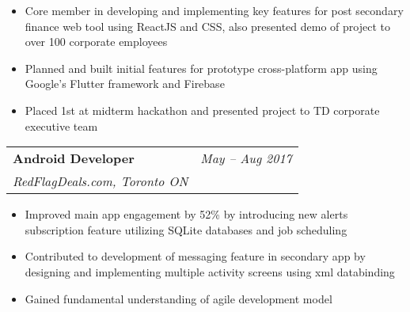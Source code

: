\documentclass[letterpaper,10pt]{article}
\makeatletter
\newcommand{\resumeItem}[2]{
  \item[]\small{
    \textbf{#1}{: #2 \vspace{-2pt}}
  }
}
\newcommand{\resumeSubheading}[4]{
  \vspace{-1pt}\item
    \begin{tabular*}{0.97\textwidth}{l@{\extracolsep{\fill}}r}
      \textbf{#1} & #2 \\
      \textit{\small#3} & \textit{\small #4} \\
    \end{tabular*}\vspace{-5pt}
}
\newcommand{\resumeItemListStart}{\begin{itemize}}
\newcommand{\resumeItemListEnd}{\end{itemize}\vspace{-5pt}}
\makeatother
\begin{document}
      \vspace{0.4em}
        \begin{minipage}{0.9\textwidth}
      \resumeItemListStart
      \item Core member in developing and implementing key features for post secondary finance web tool using {ReactJS} and {CSS}, also presented demo of project to over {100} corporate employees
      \vspace{-0.25em}
       \item Planned and built initial features for prototype cross-platform app using {Google's Flutter} framework and {Firebase}
      \vspace{-0.25em}
      \item {Placed 1st} at midterm hackathon and presented project to TD corporate executive team
      \resumeItemListEnd
      \end{minipage}%
      
    \resumeSubheading
      {Android Developer}{\textit{May -- Aug 2017}}
      {RedFlagDeals.com, Toronto ON}{}
        
        \vspace{0.40em}
        \begin{minipage}{0.9\textwidth}
      \resumeItemListStart
      \item Improved main app engagement by {52\%} by introducing new alerts subscription feature utilizing {SQLite databases} and {job scheduling}
      \vspace{-0.25em}
      \item Contributed to development of messaging feature in secondary app by designing and implementing multiple activity screens using {xml databinding}
      \vspace{-0.25em}
      \item Gained fundamental understanding of {agile} development model
      \resumeItemListEnd
      \end{minipage}
\end{document}
